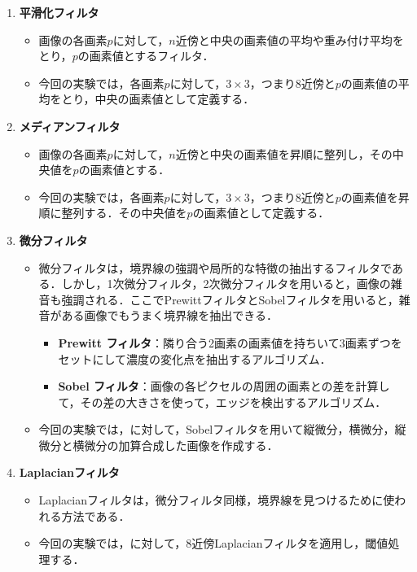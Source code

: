 \begin{enumerate}
    \item \textbf{平滑化フィルタ}
          \begin{itemize}
              \item 画像の各画素\(p\)に対して，\(n\)近傍と中央の画素値の平均や重み付け平均をとり，\(p\)の画素値とするフィルタ．
              \item 今回の実験では，各画素\(p\)に対して，\(3\times 3\)，つまり8近傍と\(p\)の画素値の平均をとり，中央の画素値として定義する．
          \end{itemize}
    \item \textbf{メディアンフィルタ}
          \begin{itemize}
              \item 画像の各画素\(p\)に対して，\(n\)近傍と中央の画素値を昇順に整列し，その中央値を\(p\)の画素値とする．
              \item 今回の実験では，各画素\(p\)に対して，\(3\times 3\)，つまり8近傍と\(p\)の画素値を昇順に整列する．その中央値を\(p\)の画素値として定義する．
          \end{itemize}
    \item \textbf{微分フィルタ}
          \begin{itemize}
              \item 微分フィルタは，境界線の強調や局所的な特徴の抽出するフィルタである．しかし，1次微分フィルタ，2次微分フィルタを用いると，画像の雑音も強調される．ここでPrewittフィルタとSobelフィルタを用いると，雑音がある画像でもうまく境界線を抽出できる\cite[p.87]{画像処理}．
                    \begin{itemize}
                        \item \textbf{Prewitt フィルタ}：隣り合う2画素の画素値を持ちいて3画素ずつをセットにして濃度の変化点を抽出するアルゴリズム\cite[p.87]{画像処理}．
                        \item \textbf{Sobel フィルタ}：画像の各ピクセルの周囲の画素との差を計算して，その差の大きさを使って，エッジを検出するアルゴリズム．
                    \end{itemize}
              \item 今回の実験では，\originimg に対して，Sobelフィルタを用いて縦微分，横微分，縦微分と横微分の加算合成した画像を作成する．
          \end{itemize}
    \item \textbf{Laplacianフィルタ}
          \begin{itemize}
              \item Laplacianフィルタは，微分フィルタ同様，境界線を見つけるために使われる方法である．
              \item 今回の実験では，\originimg に対して，8近傍Laplacianフィルタを適用し，閾値処理する．
          \end{itemize}
\end{enumerate}
